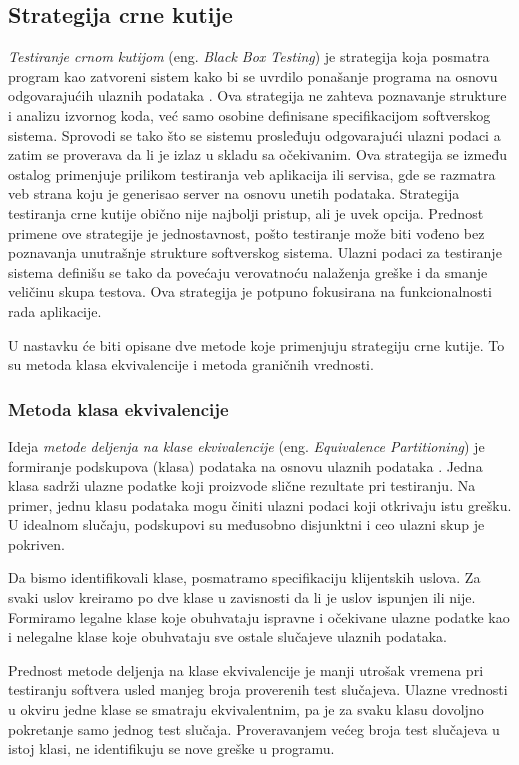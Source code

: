 \documentclass[12pt,oneside]{memoir}
\begin{document}
\subsection{Strategija crne kutije}
\emph{Testiranje crnom kutijom} (eng. \textit{Black Box Testing}) je strategija koja posmatra program kao zatvoreni sistem kako bi se uvrdilo ponašanje programa na
osnovu odgovarajućih ulaznih podataka \cite{BlackBoxTesting}. Ova strategija ne zahteva poznavanje strukture i analizu izvornog
koda, već samo osobine definisane specifikacijom softverskog sistema. Sprovodi se tako što se sistemu prosleđuju odgovarajući ulazni podaci a zatim se proverava da li je izlaz u skladu sa očekivanim. 
Ova strategija se između ostalog primenjuje prilikom testiranja veb aplikacija ili servisa, gde se razmatra veb strana koju je generisao server na osnovu unetih podataka. Strategija testiranja crne kutije obično nije najbolji pristup, ali je uvek opcija. Prednost primene ove strategije je jednostavnost, pošto testiranje može biti vođeno bez poznavanja unutrašnje
strukture softverskog sistema. Ulazni podaci za testiranje sistema definišu se tako
da povećaju verovatnoću nalaženja greške i da smanje veličinu skupa testova. Ova strategija je potpuno fokusirana na funkcionalnosti rada aplikacije. \par
U nastavku će biti opisane dve metode koje primenjuju strategiju crne kutije. To su metoda klasa ekvivalencije i metoda graničnih vrednosti.
\par 
\subsubsection{Metoda klasa ekvivalencije}
Ideja \emph{metode deljenja na klase ekvivalencije} (eng. \textit{Equivalence Partitioning}) je formiranje podskupova (klasa) podataka na osnovu ulaznih podataka \cite{PartitioningBoundary}. Jedna klasa sadrži ulazne podatke koji proizvode slične rezultate pri testiranju. Na primer, jednu klasu podataka mogu činiti ulazni podaci koji otkrivaju istu grešku. U idealnom slučaju, podskupovi su međusobno disjunktni i ceo ulazni skup je pokriven. 
\par 
Da bismo identifikovali klase, posmatramo specifikaciju klijentskih uslova.
Za svaki uslov kreiramo po dve klase u zavisnosti da li je uslov ispunjen ili nije. Formiramo legalne klase koje obuhvataju ispravne i očekivane ulazne podatke kao i nelegalne klase koje obuhvataju sve ostale slučajeve ulaznih podataka.
\par 
Prednost metode deljenja na klase ekvivalencije je manji utrošak vremena pri testiranju softvera usled manjeg broja proverenih test slučajeva. Ulazne vrednosti u okviru jedne klase se smatraju ekvivalentnim, pa je za svaku klasu dovoljno pokretanje samo jednog test slučaja. Proveravanjem većeg broja test slučajeva u istoj klasi, ne identifikuju se nove greške u programu.
\end{document}

